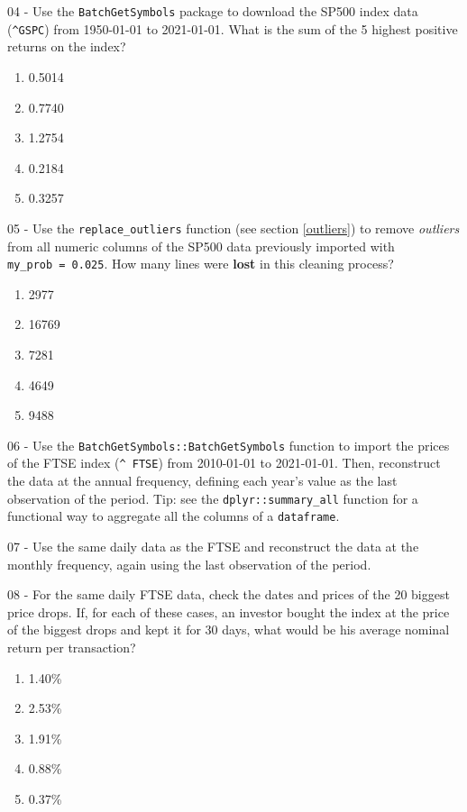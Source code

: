 \documentclass[
  12pt,
]{book}
\providecommand{\tightlist}{%
  \setlength{\itemsep}{0pt}\setlength{\parskip}{0pt}}
\begin{document}
04 -
Use the \texttt{BatchGetSymbols} package to download the SP500 index data (\texttt{\textquotesingle{}\^{}GSPC\textquotesingle{}}) from 1950-01-01 to 2021-01-01. What is the sum of the 5 highest positive returns on the index?

\begin{enumerate}
\def\labelenumi{\alph{enumi})}
\tightlist
\item
  0.5014
\item
  0.7740
\item
  1.2754
\item
  0.2184
\item
  0.3257
\end{enumerate}

05 -
Use the \texttt{replace\_outliers} function (see section \ref{outliers}) to remove \emph{outliers} from all numeric columns of the SP500 data previously imported with \texttt{my\_prob\ =\ 0.025}. How many lines were \textbf{lost} in this cleaning process?

\begin{enumerate}
\def\labelenumi{\alph{enumi})}
\tightlist
\item
  2977
\item
  16769
\item
  7281
\item
  4649
\item
  9488
\end{enumerate}

06 -
Use the \texttt{BatchGetSymbols::BatchGetSymbols} function to import the prices of the FTSE index (\texttt{\textquotesingle{}\^{}\ FTSE\textquotesingle{}}) from 2010-01-01 to 2021-01-01. Then, reconstruct the data at the annual frequency, defining each year's value as the last observation of the period. Tip: see the \texttt{dplyr::summary\_all} function for a functional way to aggregate all the columns of a \texttt{dataframe}.

07 -
Use the same daily data as the FTSE and reconstruct the data at the monthly frequency, again using the last observation of the period.

08 -
For the same daily FTSE data, check the dates and prices of the 20 biggest price drops. If, for each of these cases, an investor bought the index at the price of the biggest drops and kept it for 30 days, what would be his average nominal return per transaction?

\begin{enumerate}
\def\labelenumi{\alph{enumi})}
\tightlist
\item
  1.40\%
\item
  2.53\%
\item
  1.91\%
\item
  0.88\%
\item
  0.37\%
\end{enumerate}
\end{document}

